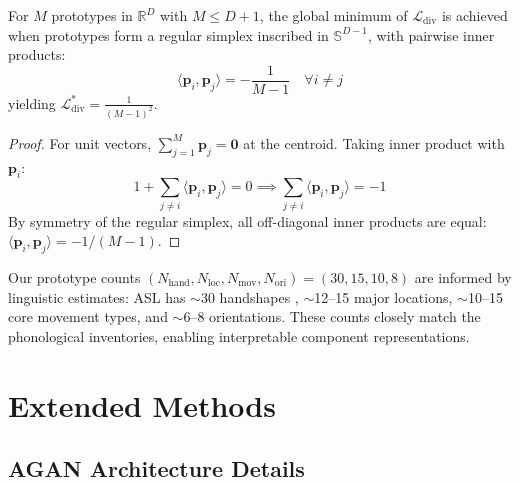 \documentclass{article}
\begin{document}
\begin{proposition}
\label{prop:optimal_config}
For $M$ prototypes in $\mathbb{R}^D$ with $M \leq D+1$, the global minimum of $\mathcal{L}_{\text{div}}$ is achieved when prototypes form a regular simplex inscribed in $\mathbb{S}^{D-1}$, with pairwise inner products:
\begin{equation}
\langle \mathbf{p}_i, \mathbf{p}_j \rangle = -\frac{1}{M-1} \quad \forall i \neq j
\end{equation}
yielding $\mathcal{L}_{\text{div}}^* = \frac{1}{(M-1)^2}$.
\end{proposition}

\begin{proof}
For unit vectors, $\sum_{j=1}^M \mathbf{p}_j = \mathbf{0}$ at the centroid. Taking inner product with $\mathbf{p}_i$:
\begin{equation}
1 + \sum_{j \neq i} \langle \mathbf{p}_i, \mathbf{p}_j \rangle = 0 \implies \sum_{j \neq i} \langle \mathbf{p}_i, \mathbf{p}_j \rangle = -1
\end{equation}
By symmetry of the regular simplex, all off-diagonal inner products are equal: $\langle \mathbf{p}_i, \mathbf{p}_j \rangle = -1/(M-1)$.
\end{proof}

\begin{remark}
Our prototype counts $(N_{\text{hand}}, N_{\text{loc}}, N_{\text{mov}}, N_{\text{ori}}) = (30, 15, 10, 8)$ are informed by linguistic estimates: ASL has $\sim$30 handshapes \citep{battison1978lexical}, $\sim$12--15 major locations, $\sim$10--15 core movement types, and $\sim$6--8 orientations. These counts closely match the phonological inventories, enabling interpretable component representations.
\end{remark}

\section{Extended Methods}

\subsection{AGAN Architecture Details}
\end{document}
